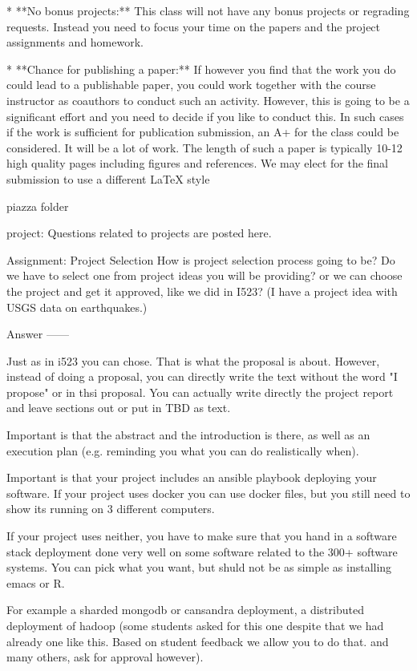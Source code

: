 * **No bonus projects:** This class will not have any bonus projects
  or regrading requests. Instead you need to focus your time on the
  papers and the project assignments and homework.

* **Chance for publishing a paper:** If however you find that the work
  you do could lead to a publishable paper, you could work together
  with the course instructor as coauthors to conduct such an
  activity. However, this is going to be a significant effort and you
  need to decide if you like to conduct this. In such cases if the
  work is sufficient for publication submission, an A+ for the class
  could be considered. It will be a lot of work. The length of such a
  paper is typically 10-12 high quality pages including figures and
  references. We may elect for the final submission to use a different
  LaTeX style

piazza folder

project:
    Questions related to projects are posted here.



Assignment: Project Selection
How is project selection process going to be? Do we have to select one from project ideas you will be providing? or we can choose the project and get it approved, like we did in I523? (I have a project idea with USGS data on earthquakes.)

Answer
------

Just as in i523 you can chose. That is what the proposal is about. However, instead of doing a proposal, you can directly write the text without the word "I propose" or in thsi proposal. You can actually write directly the project report and leave sections out or put in TBD as text. 
 
Important is that the abstract and the introduction is there, as well as an execution plan (e.g. reminding you what you can do realistically when).
 
Important is that your project includes an ansible playbook deploying your software. If your project uses docker you can use docker files, but you still need to show its running on 3 different computers. 
 
If your project uses neither, you have to make sure that you hand in a software stack deployment done very well on some software related to the 300+ software systems. You can pick what you want, but shuld not be as simple as installing emacs or R. 
 
For example a sharded mongodb or cansandra deployment, a distributed deployment of hadoop (some students asked for this one despite that we had already one like this. Based on student feedback we allow you to do that. and many others, ask for approval however).
 
